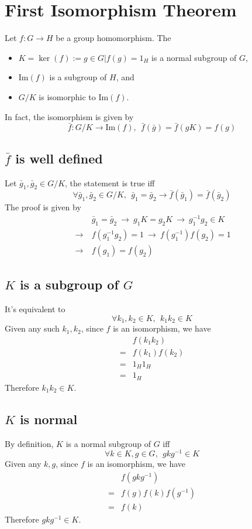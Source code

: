 \documentclass{article}
\renewcommand{\Im}{\text{Im}}
\newcommand{\rightarrows}{\ \rightarrow\ }
\begin{document}
	\section*{First Isomorphism Theorem}
	Let $f:G\rightarrow H$ be a group homomorphism. The
	\begin{itemize}
		\item $K=\ker(f):={g\in G|f(g)=1_H}$ is a normal subgroup of $G$,
		\item $\Im(f)$ is a subgroup of $H$, and
		\item $G/K$ is isomorphic to $\Im(f)$.
	\end{itemize}
	In fact, the isomorphism is given by$$
		\bar{f}:G/K\rightarrow\Im(f),\ \ \bar{f}(\bar{g})=\bar{f}(gK)=f(g)
	$$
	\subsection*{$\bar{f}$ is well defined}
	Let $\bar{g}_1,\bar{g}_2\in G/K$, the statement is true iff$$
		\forall \bar{g}_1,\bar{g}_2\in G/K,\ \ \bar{g}_1=\bar{g}_2 \rightarrow \bar{f}(\bar{g}_1)=\bar{f}(\bar{g}_2)
	$$
	The proof is given by\begin{align*}
		&\bar{g}_1=\bar{g}_2 \rightarrows g_1K=g_2K \rightarrows g_1^{-1}g_2\in K\\
		\rightarrows& f(g_1^{-1}g_2)=1 \rightarrows f(g_1^{-1})f(g_2)=1\\
		\rightarrows& f(g_1)=f(g_2)
	\end{align*}
	\subsection*{$K$ is a subgroup of $G$}
	It's equivalent to $$
		\forall k_1,k_2\in K,\ \ k_1k_2\in K
	$$
	Given any such $k_1,k_2$, since $f$ is an isomorphism, we have\begin{align*}
		&f(k_1k_2)\\
		=&f(k_1)f(k_2)\\
		=&1_H1_H\\
		=&1_H
	\end{align*}
	Therefore $k_1k_2\in K$.
	\subsection*{$K$ is normal}
	By definition, $K$ is a normal subgroup of $G$ iff $$
		\forall k\in K, g\in G,\ \ gkg^{-1}\in K
	$$
	Given any $k,g$, since $f$ is an isomorphism, we have\begin{align*}
		&f(gkg^{-1})\\
		=&f(g)f(k)f(g^{-1})\\
		=&f(k)
	\end{align*}
	Therefore $gkg^{-1}\in K$.
\end{document}
